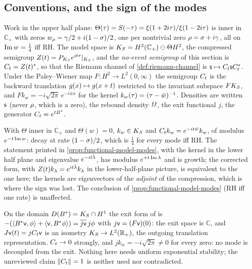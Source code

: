 \subsection{Conventions, and the sign of the modes}

Work in the upper half plane: $\Theta(\tau) = S(-\tau) = \xi(1+2i\tau)/\xi(1-2i\tau)$ is inner
in $\mathbb C_+$ with zeros $w_\rho = \gamma/2 + i(1-\sigma)/2$, one per nontrivial zero
$\rho = \sigma + i\gamma$, all on $\operatorname{Im} w = \tfrac14$ iff RH. The model space is $K_S = H^2(\mathbb C_+)
\ominus\Theta H^2$, the compressed semigroup $Z(t) = P_{K_S}e^{it\tau}|_{K_S}$, and the
\emph{no-event semigroup} of this section is $C_t = Z(t)^{*}$, so that the Riemann channel of
\cref{def:riemann-channel} is $\mathsf s\mapsto C_t\mathsf s C_t^{*}$. Under the Paley--Wiener map
$F\colon H^2\to L^2(0,\infty)$ the semigroup $C_t$ is the backward translation $g(x)\mapsto
g(x+t)$ restricted to the invariant subspace $FK_S$, and $Fk_w = -i\sqrt{2\pi}\,e^{-i\bar wx}$ for
the kernel $k_w(\tau) = (\tau-\bar w)^{-1}$. Densities are written $\mathsf s$ (never $\rho$, which is a
zero), the rebound density $\varOmega$, the exit functional $j$, the generator $C_t = e^{tB^{*}}$.

\begin{observation}
\label{obs:model-modes-sign}
With $\Theta$ inner in $\mathbb C_+$ and $\Theta(w) = 0$, $k_w\in K_S$ and $C_t k_w =
e^{-it\bar w}k_w$, of modulus $e^{-t\operatorname{Im} w}$: decay at rate $(1-\sigma)/2$, which is $\tfrac14$
for every mode iff RH. The statement printed in \cref{prop:functional-model-modes}, with the kernel in
the lower half plane and eigenvalue $e^{-it\bar\lambda}$, has modulus $e^{+t\operatorname{Im}\lambda}$ and is
growth; the corrected form, with $Z(t) k_\lambda = e^{it\bar\lambda}k_\lambda$ in the lower-half-plane
picture, is equivalent to the one here; the kernels are eigenvectors of the \emph{adjoint} of the
compression, which is where the sign was lost. The conclusion of \cref{prop:functional-model-modes}
(RH iff one rate) is unaffected.
\end{observation}

\begin{lemma}
\label{lem:exit-one-dimensional}
On the domain $D(B^{*}) = K_S\cap H^1$ the exit form of \cite{siemon2017unbounded} is
$-(\langle B^{*}\mathsf v,\phi\rangle + \langle\mathsf v,B^{*}\phi\rangle) = \overline{j\mathsf v}\,j\phi$
with $j\mathsf v = (F\mathsf v)(0)$: the exit space is $\mathbb C$, and $J\mathsf v(t) = jC_t\mathsf v$ is an
isometry $K_S\to L^2(\mathbb R_+)$, the outgoing translation representation. $C_t\to0$ strongly, and
$jk_w = -i\sqrt{2\pi}\ne0$ for every zero: no mode is decoupled from the exit. Nothing here needs
uniform exponential stability; the unreviewed claim $\|C_t\| = 1$ is neither used nor contradicted.
\end{lemma}

